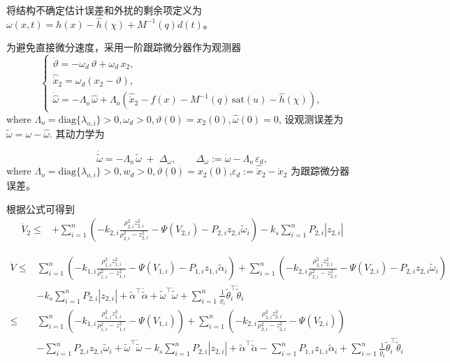 \documentclass[pdflatex,sn-mathphys-num]{sn-jnl}%
\theoremstyle{thmstyleone}%
\theoremstyle{thmstyletwo}%
\theoremstyle{thmstylethree}%
\begin{document}
将结构不确定估计误差和外扰的剩余项定义为
$\omega(x,t)=h(x)-\hat h(\chi)+ M^{-1}(q) d(t)$。

为避免直接微分速度，采用一阶跟踪微分器作为观测器
\begin{equation}
	\begin{cases}
\dot\vartheta =-\omega_d\,\vartheta+\omega_d\,x_2,  \\
\hat{\dot x}_2=\omega_d(x_2-\vartheta),   \\
\dot{\hat \omega}= -\Lambda_o\,\hat \omega
+\Lambda_o\left(\hat{\dot x}_2 - f(x) - M^{-1}(q)\,\mathrm{sat}(u) - \hat h(\chi)\right),
\end{cases}
\end{equation}
where $\Lambda_o=\mathrm{diag}\{\lambda_{o,i}\}>0, \omega_d>0, \vartheta(0)=x_2(0), \hat \omega(0)=0$,
设观测误差为 $\tilde \omega=\omega-\hat\omega$. 其动力学为

$$
\dot{\tilde\omega}
= -\Lambda_o\,\tilde\omega\;+\;\Delta_\omega,\qquad
\Delta_\omega:=\dot\omega-\Lambda_o\,\varepsilon_d,
$$
where $\Lambda_o=\mathrm{diag}\{\lambda_{o,i}\}>0, w_d>0, \vartheta(0)=x_2(0)$,$\varepsilon_d:=\hat{\dot x}_2-\dot x_2$ 为跟踪微分器误差。


根据公式可得到
\begin{equation}
	\begin{aligned}
	\dot V_2
\le&+\sum_{i=1}^n \left( - k_{2,i}\frac{\rho_{2,i}^2 z_{2,i}^2}{\rho_{2,i}^2-z_{2,i}^2}-\Psi(V_{2,i})-P_{2,i}z_{2,i}\tilde{\omega}_i  \right) -k_s\sum_{i=1}^n P_{2,i} \left\lvert z_{2,i}\right\rvert
\end{aligned}
\end{equation}








\begin{equation}\label{eq:45}
	\begin{aligned}
		\dot{V} \le&\sum_{i=1}^n \left( - k_{1,i}\frac{\rho_{1,i}^2 z_{1,i}^2}{\rho_{1,i}^2-z_{1,i}^2}-\Psi(V_{1,i})-P_{1,i}z_{1,i}\tilde\alpha_i\right)
		+\sum_{i=1}^n \left( - k_{2,i}\frac{\rho_{2,i}^2 z_{2,i}^2}{\rho_{2,i}^2-z_{2,i}^2}-\Psi(V_{2,i})-P_{2,i}z_{2,i}\tilde{\omega}_i  \right)\\
		& -k_s\sum_{i=1}^n P_{2,i} \left\lvert z_{2,i}\right\rvert +\tilde\alpha^\top \dot{\tilde \alpha}+\tilde \omega^\top \dot{\tilde \omega}+\sum_{i=1}^n\tfrac{1}{\varrho_i}\tilde \theta_i^\top \dot{\tilde \theta}_i \\
		\le&\sum_{i=1}^n \left( - k_{1,i}\frac{\rho_{1,i}^2 z_{1,i}^2}{\rho_{1,i}^2-z_{1,i}^2}-\Psi(V_{1,i})\right)
		+\sum_{i=1}^n \left( - k_{2,i}\frac{\rho_{2,i}^2 z_{2,i}^2}{\rho_{2,i}^2-z_{2,i}^2}-\Psi(V_{2,i})  \right)\\
		& -\sum_{i=1}^nP_{2,i}z_{2,i}\tilde{\omega}_i +\tilde \omega^\top \dot{\tilde \omega}-k_s\sum_{i=1}^n P_{2,i} \left\lvert z_{2,i}\right\rvert+\tilde\alpha^\top \dot{\tilde \alpha}-\sum_{i=1}^n P_{1,i}z_{1,i}\tilde\alpha_i+\sum_{i=1}^n\tfrac{1}{\varrho_i}\tilde \theta_i^\top \dot{\tilde \theta}_i 
	\end{aligned}
\end{equation}
\end{document}
